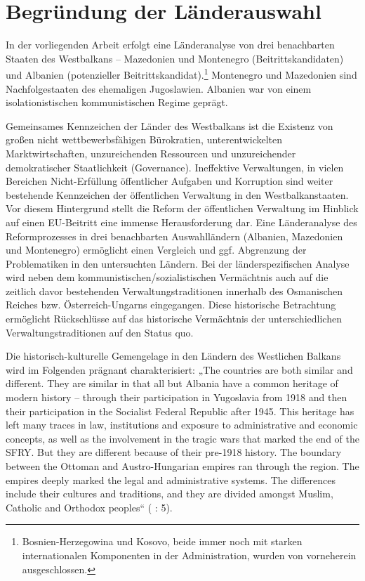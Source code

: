 \section{Begründung der Länderauswahl}
In der vorliegenden Arbeit erfolgt eine Länderanalyse von drei benachbarten Staaten des Westbalkans – Mazedonien und Montenegro (Beitrittskandidaten) und Albanien (potenzieller Beitrittskandidat).\footnote{Bosnien-Herzegowina und Kosovo, beide immer noch mit starken internationalen Komponenten in der Administration, wurden von vorneherein ausgeschlossen.} Montenegro und Mazedonien sind Nachfolgestaaten des ehemaligen Jugoslawien. Albanien war von einem isolationistischen kommunistischen Regime geprägt.
\par
Gemeinsames Kennzeichen der Länder des Westbalkans ist die Existenz von großen nicht wettbewerbsfähigen Bürokratien, unterentwickelten Marktwirtschaften, unzureichenden Ressourcen und unzureichender demokratischer Staatlichkeit (Governance). Ineffektive Verwaltungen, in vielen Bereichen Nicht-Erfüllung öffentlicher Aufgaben und Korruption sind weiter bestehende Kennzeichen der öffentlichen Verwaltung in den Westbalkanstaaten. Vor diesem Hintergrund stellt die Reform der öffentlichen Verwaltung im Hinblick auf einen EU-Beitritt eine immense Herausforderung dar.
Eine Länderanalyse des Reformprozesses in drei benachbarten Auswahlländern (Albanien, Mazedonien und Montenegro) ermöglicht einen Vergleich und ggf. Abgrenzung der Problematiken in den untersuchten Ländern. Bei der länderspezifischen Analyse wird neben dem kommunistischen/sozialistischen Vermächtnis auch auf die zeitlich davor bestehenden Verwaltungstraditionen innerhalb des Osmanischen Reiches bzw. Österreich-Ungarns eingegangen. Diese historische Betrachtung ermöglicht Rückschlüsse auf das historische Vermächtnis der unterschiedlichen Verwaltungstraditionen auf den Status quo.\par
Die historisch-kulturelle Gemengelage in den Ländern des Westlichen Balkans wird im Folgenden prägnant charakterisiert: „The countries are both similar and different. They are similar in that all but Albania have a common heritage of modern history -- through their participation in Yugoslavia from 1918 and then their participation in the Socialist Federal Republic after 1945. This heritage has left many traces in law, institutions and exposure to administrative and economic concepts, as well as the involvement in the tragic wars that marked the end of the SFRY. But they are different because of their pre-1918 history. The boundary between the Ottoman and Austro-Hungarian empires ran through the region. The empires deeply marked the legal and administrative systems. The differences include their cultures and traditions, and they are divided amongst Muslim, Catholic and Orthodox peoples“ (\cite{oecd04} : 5).\par
